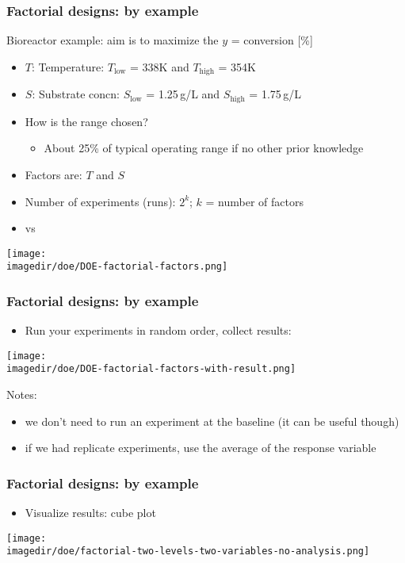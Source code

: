 \begin{frame}\frametitle{Factorial designs: by example}

	Bioreactor example: aim is to maximize the $y$ = conversion [\%]
	\begin{itemize}
		\item	$T$: Temperature: $T_\text{low}$ = 338K and $T_\text{high}$ = 354K
		\item	$S$: Substrate concn: $S_\text{low}$ = 1.25\,g/L and $S_\text{high}$ = 1.75\,g/L
		\item	How is the range chosen?
		\begin{itemize}
			\item	About 25\% of typical operating range if no other prior knowledge
		\end{itemize}
	\end{itemize}
	\begin{itemize}
		\item	Factors are: $T$ and $S$
		\item	Number of experiments (runs): $2^k$; $k$ = number of factors
		\item	{\color{purple}{Standard order}} vs {\color{purple}{Actual execution (run) order}}
	\end{itemize}
	\begin{center}
		\texttt{[image: \\imagedir/doe/DOE-factorial-factors.png]}
	\end{center}
\end{frame}

\begin{frame}\frametitle{Factorial designs: by example}
	\begin{itemize}
		\item	Run your experiments in random order, collect results:
	\end{itemize}
	\begin{center}
		\texttt{[image: \\imagedir/doe/DOE-factorial-factors-with-result.png]}
	\end{center}
	Notes:
	\begin{itemize}
		\item	we don't need to run an experiment at the baseline (it can be useful though)
		\item	if we had replicate experiments, use the average of the response variable
	\end{itemize}
\end{frame}

\begin{frame}\frametitle{Factorial designs: by example}
	\begin{itemize}
		\item	Visualize results: cube plot
	\end{itemize}
	\begin{center}
		\texttt{[image: \\imagedir/doe/factorial-two-levels-two-variables-no-analysis.png]}
	\end{center}
\end{frame}

